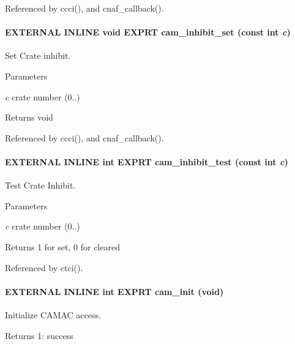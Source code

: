Referenced by ccci(), and cnaf\_\-callback().
\paragraph[{cam\_\-inhibit\_\-set}]{\setlength{\rightskip}{0pt plus 5cm}EXTERNAL INLINE void EXPRT cam\_\-inhibit\_\-set (const int {\em c})}\hfill\label{group__mcstdfunctionh_gaa171934ed8e8ce2af3ec97f4192aa27b}
Set Crate inhibit. 
\begin{DoxyParams}{Parameters}
\item[{\em c}]crate number (0..) \end{DoxyParams}
\begin{DoxyReturn}{Returns}
void 
\end{DoxyReturn}


Referenced by ccci(), and cnaf\_\-callback().
\paragraph[{cam\_\-inhibit\_\-test}]{\setlength{\rightskip}{0pt plus 5cm}EXTERNAL INLINE int EXPRT cam\_\-inhibit\_\-test (const int {\em c})}\hfill\label{group__mcstdfunctionh_ga9bf24cf17380c556bda27c53c7bfb248}
Test Crate Inhibit. 
\begin{DoxyParams}{Parameters}
\item[{\em c}]crate number (0..) \end{DoxyParams}
\begin{DoxyReturn}{Returns}
1 for set, 0 for cleared 
\end{DoxyReturn}


Referenced by ctci().
\paragraph[{cam\_\-init}]{\setlength{\rightskip}{0pt plus 5cm}EXTERNAL INLINE int EXPRT cam\_\-init (void)}\hfill\label{group__mcstdfunctionh_ga6c97ce64e84d233efe4de457ec495d2f}
Initialize CAMAC access. \begin{DoxyReturn}{Returns}
1: success 
\end{DoxyReturn}


